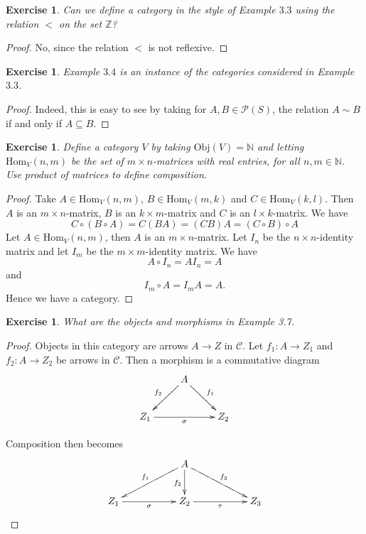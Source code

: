 \documentclass[a4paper, 11pt]{book}
\theoremstyle{plain}
\newtheorem{exercise}[theorem]{Exercise}
\theoremstyle{plain}
\begin{document}
\begin{exercise}
Can we define a category in the style of Example $3.3$ using the relation $<$ on the set $\mathbb{Z}$?
\end{exercise}
\begin{proof}
No, since the relation $<$ is not reflexive.
\end{proof}

\begin{exercise}
Example $3.4$ is an instance of the categories considered in Example $3.3$.
\end{exercise}
\begin{proof}
Indeed, this is easy to see by taking for $A,B\in \mathcal{P}(S)$, the relation $A\sim B$ if and only if $A\subseteq B$.
\end{proof}

\begin{exercise}
Define a category $V$ by taking $\text{Obj}(V) = \mathbb{N}$ and letting $\text{Hom}_V(n,m)$ be the set of $m\times n$-matrices with real entries, for all $n,m\in \mathbb{N}$. Use product of matrices to define composition.
\end{exercise}
\begin{proof}
Take $A\in \text{Hom}_V(n,m)$, $B\in \text{Hom}_V(m,k)$ and $C\in \text{Hom}_V(k,l)$. Then $A$ is an $m\times n$-matrix, $B$ is an $k\times m$-matrix and $C$ is an $l\times k$-matrix. We have
$$C\circ (B\circ A) = C(BA) = (CB)A = (C\circ B)\circ A$$
Let $A\in \text{Hom}_V(n,m)$, then $A$ is an $m\times n$-matrix. Let $I_n$ be the $n\times n$-identity matrix and let $I_m$ be the $m\times m$-identity matrix. We have
$$A\circ I_n = AI_n = A$$
and
$$I_m\circ A = I_mA = A.$$
Hence we have a category.
\end{proof}

\begin{exercise}
What are the objects and morphisms in Example 3.7.
\end{exercise}
\begin{proof}
Objects in this category are arrows $A\rightarrow Z$ in $\mathcal{C}$. Let $f_1:A\rightarrow Z_1$ and $f_2:A\rightarrow Z_2$ be arrows in $\mathcal{C}$. Then a morphism is a commutative diagram
$$\xymatrix{
& A\ar[ld]_{f_2}\ar[rd]^{f_1} & \\
Z_1\ar[rr]_\sigma & & Z_2
}$$

Composition then becomes
$$\xymatrix{
& & A\ar[lld]_{f_1} \ar[d]_{f_2} \ar[rrd]^{f_3} & & \\
Z_1\ar[rr]_\sigma & & Z_2\ar[rr]_\tau & & Z_3
}$$

\end{proof}
\end{document}
